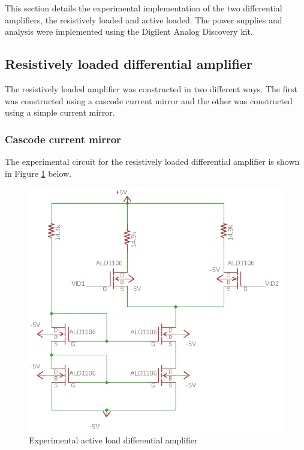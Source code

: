 




This section details the experimental implementation of the two differential amplifiers, the resistively loaded and active loaded. The power supplies and analysis were implemented using the Digilent Analog Discovery kit.

\subsection{Resistively loaded differential amplifier}
The resistively loaded amplifier was constructed in two different ways. The first was constructed using a cascode current mirror and the other was constructed using a simple current mirror.

\subsubsection{Cascode current mirror}

The experimental circuit for the resistively loaded differential amplifier is shown in Figure \ref{fig:ResLoadExp} below.



\begin{figure}[H]
    \begin{center}
    \includegraphics[scale=.75]{ExperimentalImplementation/ResLoadedExp.png}
    \caption{Experimental active load differential amplifier}
    \label{fig:ResLoadExp}
    \end{center}
\end{figure}

